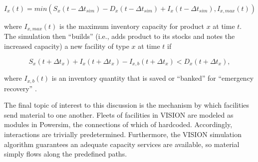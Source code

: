\begin{equation}
I_x(t) = min \left( S_x(t-\Delta t_{sim}) - D_x(t-\Delta t_{sim}) 
       + I_x(t-\Delta t_{sim}), I_{x,max}(t) \right)
\end{equation}

where $I_{x,max}(t)$ is the maximum inventory capacity for product $x$ at time
$t$. The simulation then ``builds'' (i.e., adds product to its stocks and notes
the increased capacity) a new facility of type $x$ at time $t$ if 

\begin{equation}
S_x(t + \Delta t_x) + I_x(t + \Delta t_x) - 
      I_{x,b}(t + \Delta t_x) < D_x(t + \Delta t_x),
\end{equation}

where $I_{x,b}(t)$ is an inventory quantity that is saved or ``banked'' for
``emergency recovery'' \cite{schweitzer_improved_2008}.

The final topic of interest to this discussion is the mechanism by which
facilities send material to one another. Fleets of facilities in VISION are
modeled as modules in Powersim, the connections of which of
hardcoded. Accordingly, interactions are trivially predetermined. Furthermore,
the VISION simulation algorithm guarantees an adequate capacity services are
available, so material simply flows along the predefined paths.
